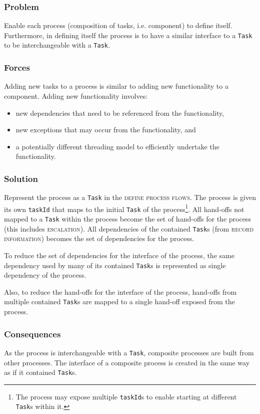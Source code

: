 \documentclass[prodmode]{style/acmlarge}
\begin{document}
\subsubsection*{\textbf{Problem}} Enable each process (composition of tasks, i.e.
component) to define itself.  Furthermore, in defining itself the process is to
have a similar interface to a \texttt{Task} to be interchangeable with a
\texttt{Task}.

\subsubsection*{Forces} Adding new tasks to a process is similar to adding new
functionality to a component.  Adding new functionality involves:
\begin{itemize}
  \item new dependencies that need to be referenced from the functionality,
  \item new exceptions that may occur from the functionality, and
  \item a potentially different threading model to efficiently undertake the functionality. 
\end{itemize}

\subsubsection*{\textbf{Solution}} Represent the process as a \texttt{Task} in the
\textsc{define process flows}.  The process is given its own \texttt{taskId}
that maps to the initial \texttt{Task} of the process\footnote{The process may
expose multiple \texttt{taskId}s to enable starting at different \texttt{Task}s
within it.}.  All hand-offs not mapped to a \texttt{Task} within the process
become the set of hand-offs for the process (this includes \textsc{escalation}).
All dependencies of the contained \texttt{Task}s (from \textsc{record
information}) becomes the set of dependencies for the process.

To reduce the set of dependencies for the interface of the process, the same
dependency used by many of its contained \texttt{Task}s is represented as single
dependency of the process.

Also, to reduce the hand-offs for the interface of the process, hand-offs
from multiple contained \texttt{Task}s are mapped to a single hand-off exposed
from the process.

\subsubsection*{Consequences} As the process is interchangeable with a
\texttt{Task}, composite processes are built from other processes.  The
interface of a composite process is created in the same way as if it contained
\texttt{Task}s.
\end{document}
